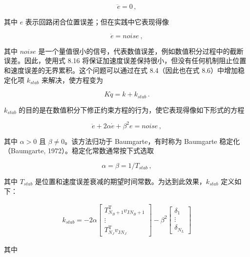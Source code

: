 \documentclass[10pt,a4paper]{book}
\theoremstyle{thmstyle} %
\theoremstyle{defstyle} %
\theoremstyle{prostyle} %
\begin{document}
$$
\ddot { e } = 0 \, ,
$$



其中 $e$ 表示回路闭合位置误差；但在实践中它表现得像



$$
\ddot { e } = n o i s e \ ,
$$



其中 $noise$ 是一个量值很小的信号，代表数值误差，例如数值积分过程中的截断误差。因此，使用式 8.16 将保证加速度误差保持很小，但没有任何机制阻止位置和速度误差的无界累积。这个问题可以通过在式 8.4（因此也在式 8.6）中增加稳定化项 $k_{stab}$ 来解决，使方程变为



$$
K \ddot { q } = k + k _ { s t a b } \, .
$$



$k_{stab}$ 的目的是在数值积分下修正约束方程的行为，使它表现得像如下形式的方程



$$
\ddot { e } + 2 \alpha \dot { e } + \beta ^{2} e = n o i s e \, ,
$$



其中 $\alpha > 0$ 且 $\beta \neq 0$。该方法归功于 Baumgarte，有时称为 Baumgarte 稳定化（Baumgarte, 1972）。稳定化常数通常按下式选取



$$
\alpha = \beta = 1 / T _ { s t a b } \, ,
$$



其中 $T_{stab}$ 是位置和速度误差衰减的期望时间常数。为达到此效果，$k_{stab}$ 定义如下：



$$
\begin{array}{r} { k _ { s t a b } = - 2 \alpha \left[ \begin{array}{l} { T _ { N _ { B } + 1 } ^{\mathrm { T} } v _ { \mathrm { J } N _ { B } + 1 } } \\{ \vdots } \\{ T _ { N _ { J } } ^{\mathrm { T} } v _ { \mathrm { J } N _ { J } } } \end{array} \right] - \beta ^{2} \left[ \begin{array}{l} { \delta _ { 1 } } \\{ \vdots } \\{ \delta _ { N _ { L } } } \end{array} \right] } \end{array}
$$



其中
\end{document}
